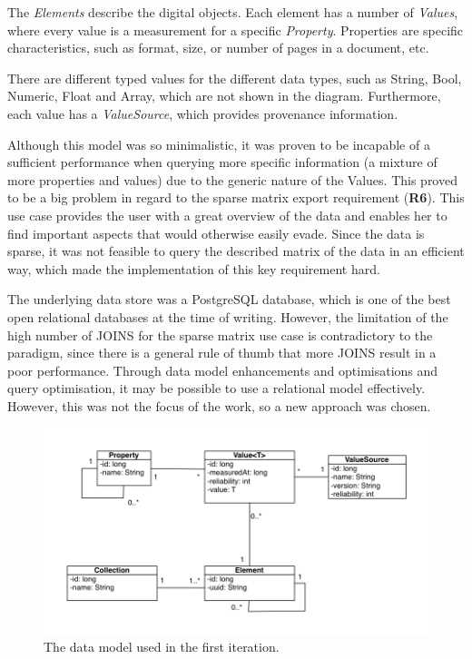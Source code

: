 The \textit{Elements} describe the digital objects. Each element has a number of \textit{Values}, where every value is a measurement for a specific \textit{Property}. Properties are specific characteristics, such as format, size, or number of pages in a document, etc. 

There are different typed values for the different data types, such as String, Bool, Numeric, Float and Array, which are not shown in the diagram. Furthermore, each value has a \textit{ValueSource}, which provides provenance information.

Although this model was so minimalistic, it was proven to be incapable of a sufficient performance when querying more specific information (a mixture of more properties and values) due to the generic nature of the Values. This proved to be a big problem in regard to the sparse matrix export requirement (\textbf{R6}). This use case provides the user with a great overview of the data and enables her to find important aspects that would otherwise easily evade. Since the data is sparse, it was not feasible to query the described matrix of the data in an efficient way, which made the implementation of this key requirement hard.

The underlying data store was a PostgreSQL database, which is one of the best open relational databases at the time of writing. However, the limitation of the high number of JOINS for the sparse matrix use case is contradictory to the paradigm, since there is a general rule of thumb that more JOINS result in a poor performance. Through data model enhancements and optimisations and query optimisation, it may be possible to use a relational model effectively. However, this was not the focus of the work, so a new approach was chosen.

\begin{figure}[t]
\begin{center}
\includegraphics[width=5in]{figures/architecture/old_datamodel.png}
\caption{The data model used in the first iteration.}
\label{fig:old_datamodel}
\end{center}
\end{figure}

